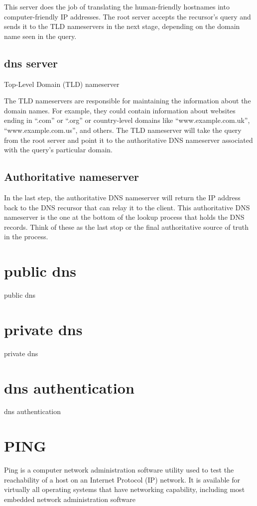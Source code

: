 \documentclass[a4paper,12pt]{book}
\begin{document}
This server does the job of translating the human-friendly hostnames into computer-friendly IP addresses. The root server accepts the recursor’s query and sends it to the TLD nameservers in the next stage, depending on the domain name seen in the query.

\subsection{dns server}

Top-Level Domain (TLD) nameserver

The TLD nameservers are responsible for maintaining the information about the domain names. For example, they could contain information about websites ending in “.com” or “.org” or country-level domains like “www.example.com.uk”, “www.example.com.us”, and others. The TLD nameserver will take the query from the root server and point it to the authoritative DNS nameserver associated with the query’s particular domain.

\subsection{Authoritative nameserver}

In the last step, the authoritative DNS nameserver will return the IP address back to the DNS recursor that can relay it to the client. This authoritative DNS nameserver is the one at the bottom of the lookup process that holds the DNS records. Think of these as the last stop or the final authoritative source of truth in the process.

\section{public dns}
public dns
\section{private dns}
private dns
\section{dns authentication}
dns authentication

\section{PING}
Ping is a computer network administration software utility used to test the reachability of a host on an Internet Protocol (IP) network. It is available for virtually all operating systems that have networking capability, including most embedded network administration software
\end{document}
